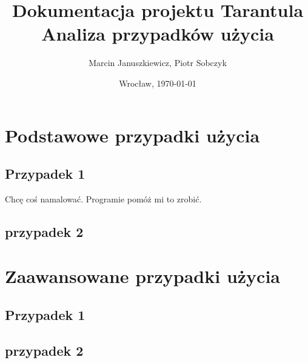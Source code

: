 \documentclass[11pt,leqno]{article}
\title{\LARGE Dokumentacja projektu \textbf{Tarantula}\\
							Analiza przypadków użycia}
\author{Marcin Januszkiewicz, Piotr Sobczyk}
\date{Wrocław, \today}
\begin{document}
\maketitle 
\newpage
\tableofcontents
\newpage
\pagestyle{headings}

\section{Podstawowe przypadki użycia}

\subsection{Przypadek 1}
Chcę coś namalować. Programie pomóż mi to zrobić.
\subsection{przypadek 2}

\section{Zaawansowane przypadki użycia}

\subsection{Przypadek 1}

\subsection{przypadek 2}
\end{document}
